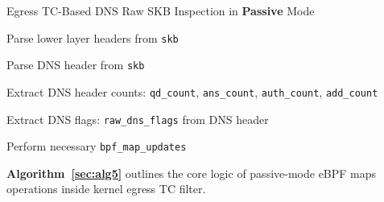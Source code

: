 \documentclass [11pt, proquest] {uwthesis}[2020/02/24]
\begin{document}
\begin{algorithm}[H]
\caption{Egress TC-Based DNS Raw SKB Inspection in \textbf{Passive} Mode}
\label{sec:alg4}

\small
{}



Parse lower layer headers from \texttt{skb}\;

Parse DNS header from \texttt{skb}\;

Extract DNS header counts: \texttt{qd\_count}, \texttt{ans\_count}, \texttt{auth\_count}, \texttt{add\_count}\;


Extract DNS flags: \texttt{raw\_dns\_flags} from DNS header\;




Perform necessary \texttt{bpf\_map\_updates}\;

\end{algorithm}

\newpage
\noindent
\textbf{Algorithm~\ref{sec:alg5}} outlines the core logic of passive-mode eBPF maps operations inside kernel egress TC filter.
\end{document}
